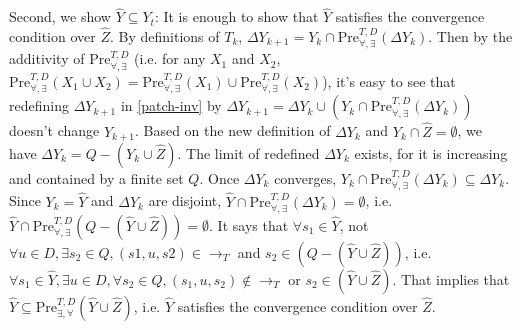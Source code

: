 Second, we show $ \widehat{Y}\subseteq Y_t $: It is enough to show that $ \widehat{Y} $ satisfies the convergence condition over $ \widehat{Z} $. By definitions of $ T_k $, $ \Delta Y_{k+1}= Y_k \cap \text{Pre}_{\forall,\exists}^{T, D}(\Delta Y_k)$. Then by the additivity of $ \text{Pre}^{T,D}_{\forall,\exists} $ (i.e. for any $ X_1 $ and $ X_2 $, $ \text{Pre}_{\forall,\exists}^{T,D} (X_1\cup X_2)=\text{Pre}_{\forall,\exists}^{T,D} (X_1)\cup \text{Pre}_{\forall,\exists}^{T,D} (X_2) $), it's easy to see that redefining $ \Delta Y_{k+1} $ in \eqref{patch-inv} by $ \Delta Y_{k+1} = \Delta Y_k \cup (Y_k \cap \text{Pre}_{\forall,\exists}^{T, D}(\Delta Y_k)) $ doesn't change $ Y_{k+1} $.  Based on the new definition of $ \Delta Y_k $ and $ Y_k \cap \widehat{Z} = \emptyset $, we have $ \Delta Y_k = Q-(Y_k\cup \widehat{Z}) $. The limit of redefined $ \Delta Y_k $ exists, for it is increasing and contained by a finite set $ Q $. Once $ \Delta Y_k $ converges, $ Y_k \cap \text{Pre}_{\forall,\exists}^{T, D}(\Delta Y_k)\subseteq \Delta Y_k $. Since $ Y_k=\widehat{Y} $ and $ \Delta Y_k $ are disjoint, $ \widehat{Y} \cap \text{Pre}_{\forall,\exists}^{T, D}(\Delta Y_k) = \emptyset $, i.e.  $ \widehat{Y} \cap \text{Pre}_{\forall,\exists}^{T, D}(Q-(\widehat{Y}\cup \widehat{Z})) = \emptyset $. It says that $ \forall s_1 \in \widehat{Y}$, not $\forall u\in D, \exists s_2\in Q, (s1,u,s2)\in \rightarrow_{T} $ and $s_2\in (Q-(\widehat{Y}\cup \widehat{Z}))$, i.e. $ \forall s_1 \in \widehat{Y}, \exists u\in D, \forall s_2 \in Q,  (s_1,u,s_2)\not\in \rightarrow_{T}$ or $ s_2\in (\widehat{Y}\cup \widehat{Z})$. That implies that $ \widehat{Y}\subseteq \text{Pre}_{\exists,\forall}^{T,D}(\widehat{Y}\cup \widehat{Z}) $, i.e. $ \widehat{Y} $ satisfies the convergence condition over $ \widehat{Z} $. \QEDB
